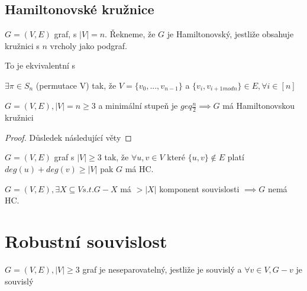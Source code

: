 \documentclass[../main.tex]{subfiles}
\begin{document}
\subsection{Hamiltonovské kružnice}
\begin{definition}
    $G=(V,E)$ graf, s $|V|=n$. Řekneme, že $G$ je Hamiltonovský, jestliže obsahuje kružnici s $n$ vrcholy jako podgraf.
\end{definition}

To je ekvivalentní s
\begin{theorem}
    $\exists \pi \in S_n$ (permutace V) tak, že $V=\{v_0,...,v_{n-1}\}$ a $\{v_i, v_{i+1 mod n}\} \in E, \forall i \in [n]$
\end{theorem}



\begin{theorem}[Dirac]
    $G=(V,E), |V|=n\geq 3$ a minimální stupeň je $geq \frac{n}{2} \implies G$ má Hamiltonovskou kružnici
\end{theorem}
\begin{proof}
    Důsledek následující věty
\end{proof}

\begin{theorem}[ORE]
    $G= (V,E)$ graf s $|V|\geq 3$ tak, že $\forall u,v\in V$ které $\{u,v\}\notin E$ platí $deg(u) + deg(v) \geq |V|$ pak $G$ má HC.    
\end{theorem}

    
    






\begin{claim}
    $G=(V,E), \exists X \subseteq V s.t. G-X$ má $>|X|$ komponent souvislosti $\implies G$ nemá HC. 
\end{claim}

\section{Robustní souvislost}

\begin{definition}
    $G=(V,E), |V|\geq 3$ graf je neseparovatelný, jestliže je souvislý a $\forall v \in V, G-v$ je souvislý 
\end{definition}
\end{document}
